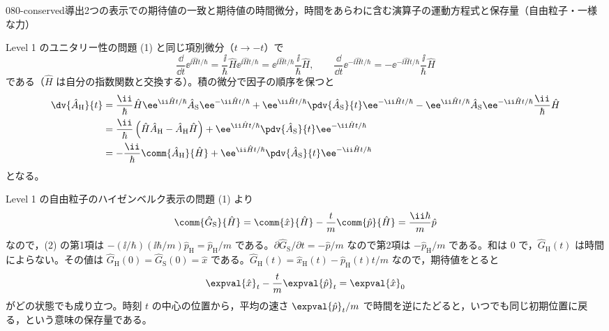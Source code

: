 \documentclass[uplatex,dvipdfmx,a4paper,11pt]{jsarticle}
\begin{document}
\begin{mondai}{080-conserved}{導出}{2つの表示での期待値の一致と期待値の時間微分，時間をあらわに含む演算子の運動方程式と保存量（自由粒子・一様な力）}
\begin{tadashii}
 Level 1 のユニタリー性の問題 (1) と同じ項別微分（$t\to-t$）で
\[ \frac{\dd}{\dd t}\ee^{\ii\hat{H}t/\hbar}=\frac{\ii}{\hbar}\hat{H}\ee^{\ii\hat{H}t/\hbar}=\ee^{\ii\hat{H}t/\hbar}\frac{\ii}{\hbar}\hat{H},\qquad \frac{\dd}{\dd t}\ee^{-\ii\hat{H}t/\hbar}=-\ee^{-\ii\hat{H}t/\hbar}\frac{\ii}{\hbar}\hat{H} \]
である（$\hat{H}$ は自分の指数関数と交換する）。積の微分で因子の順序を保つと
\begin{align*}
\dv{\hat{A}_{\mathrm{H}}}{t}&=\frac{\ii}{\hbar}\hat{H}\ee^{\ii\hat{H}t/\hbar}\hat{A}_{\mathrm{S}}\ee^{-\ii\hat{H}t/\hbar}+\ee^{\ii\hat{H}t/\hbar}\pdv{\hat{A}_{\mathrm{S}}}{t}\ee^{-\ii\hat{H}t/\hbar}-\ee^{\ii\hat{H}t/\hbar}\hat{A}_{\mathrm{S}}\ee^{-\ii\hat{H}t/\hbar}\frac{\ii}{\hbar}\hat{H}\\
&=\frac{\ii}{\hbar}\left(\hat{H}\hat{A}_{\mathrm{H}}-\hat{A}_{\mathrm{H}}\hat{H}\right)+\ee^{\ii\hat{H}t/\hbar}\pdv{\hat{A}_{\mathrm{S}}}{t}\ee^{-\ii\hat{H}t/\hbar}\\
&=-\frac{\ii}{\hbar}\comm{\hat{A}_{\mathrm{H}}}{\hat{H}}+\ee^{\ii\hat{H}t/\hbar}\pdv{\hat{A}_{\mathrm{S}}}{t}\ee^{-\ii\hat{H}t/\hbar}
\end{align*}
となる。

 Level 1 の自由粒子のハイゼンベルク表示の問題 (1) より
\[ \comm{\hat{G}_{\mathrm{S}}}{\hat{H}}=\comm{\hat{x}}{\hat{H}}-\frac{t}{m}\comm{\hat{p}}{\hat{H}}=\frac{\ii\hbar}{m}\hat{p} \]
なので，(2) の第1項は $-(\ii/\hbar)(\ii\hbar/m)\hat{p}_{\mathrm{H}}=\hat{p}_{\mathrm{H}}/m$ である。$\partial\hat{G}_{\mathrm{S}}/\partial t=-\hat{p}/m$ なので第2項は $-\hat{p}_{\mathrm{H}}/m$ である。和は $0$ で，$\hat{G}_{\mathrm{H}}(t)$ は時間によらない。その値は $\hat{G}_{\mathrm{H}}(0)=\hat{G}_{\mathrm{S}}(0)=\hat{x}$ である。$\hat{G}_{\mathrm{H}}(t)=\hat{x}_{\mathrm{H}}(t)-\hat{p}_{\mathrm{H}}(t)t/m$ なので，期待値をとると
\[ \expval{\hat{x}}_{t}-\frac{t}{m}\expval{\hat{p}}_{t}=\expval{\hat{x}}_{0} \]
がどの状態でも成り立つ。時刻 $t$ の中心の位置から，平均の速さ $\expval{\hat{p}}_{t}/m$ で時間を逆にたどると，いつでも同じ初期位置に戻る，という意味の保存量である。


\end{tadashii}
\end{mondai}
\end{document}
